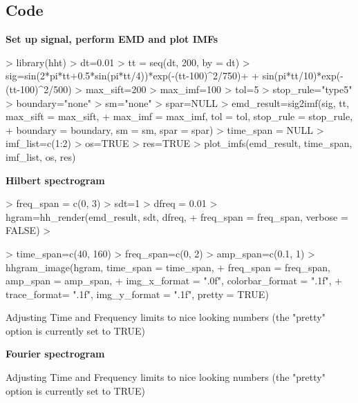 \documentclass[12pt]{article}
\begin{document}
\subsection{Code}

\textbf{Set up signal, perform EMD and plot IMFs}
\begin{Schunk}
\begin{Sinput}
> library(hht)
> dt=0.01
> tt = seq(dt, 200, by = dt)
> sig=sin(2*pi*tt+0.5*sin(pi*tt/4))*exp(-(tt-100)^2/750)+
+     sin(pi*tt/10)*exp(-(tt-100)^2/500)
> max_sift=200
> max_imf=100
> tol=5
> stop_rule="type5"
> boundary="none"
> sm="none"
> spar=NULL
> emd_result=sig2imf(sig, tt, max_sift = max_sift,
+     max_imf = max_imf, tol = tol, stop_rule = stop_rule,
+     boundary = boundary, sm = sm, spar = spar)
> time_span = NULL
> imf_list=c(1:2)
> os=TRUE
> res=TRUE
> plot_imfs(emd_result, time_span, imf_list, os, res)
\end{Sinput}
\end{Schunk}

\textbf{Hilbert spectrogram}

\begin{Schunk}
\begin{Sinput}
> freq_span = c(0, 3)
> sdt=1
> dfreq = 0.01
> hgram=hh_render(emd_result, sdt, dfreq, 
+     freq_span = freq_span, verbose = FALSE)
> 
\end{Sinput}
\end{Schunk}

\begin{Schunk}
\begin{Sinput}
> time_span=c(40, 160)
> freq_span=c(0, 2)
> amp_span=c(0.1, 1)
> hhgram_image(hgram, time_span = time_span, 
+     freq_span = freq_span, amp_span = amp_span,
+     img_x_format = ".0f", colorbar_format = ".1f", 
+     trace_format= ".1f", img_y_format = ".1f", pretty = TRUE)
\end{Sinput}
\begin{Soutput}
Adjusting Time and Frequency limits to nice looking numbers (the "pretty" option is currently set to TRUE)
\end{Soutput}
\end{Schunk}

\textbf{Fourier spectrogram}
\begin{Schunk}
\begin{Soutput}
Adjusting Time and Frequency limits to nice looking numbers (the "pretty" option is currently set to TRUE)
\end{Soutput}
\end{Schunk}
\end{document}

